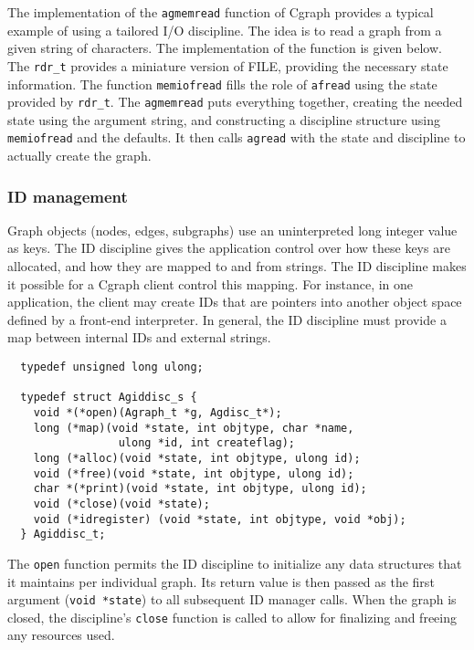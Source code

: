 \documentclass[11pt,letterpaper]{article}
\begin{document}
The implementation of the \verb"agmemread" function of Cgraph provides a typical example of using
a tailored I/O discipline. The idea is to read a graph from a given string of characters. The 
implementation of the function is given below.
The \verb"rdr_t" provides a miniature version of FILE, providing the necessary state information.
The function \verb"memiofread" fills the role of \verb"afread" using the state provided by \verb"rdr_t".
The \verb"agmemread" puts everything together, creating the needed state using the argument string, 
and constructing a discipline structure using \verb"memiofread" and the defaults. It then calls
\verb"agread" with the state and discipline to actually create the graph.


\subsubsection{ID management}
Graph objects (nodes, edges, subgraphs) use an uninterpreted long integer value as keys.
The ID discipline gives the application control over how these keys are allocated, and how
they are mapped to and from strings.
The ID discipline makes it possible for a Cgraph client
control this mapping.  For instance, in one application, the client
may create IDs that are pointers into another object space defined by
a front-end interpreter.  In general, the ID discipline must provide
a map between internal IDs and external strings.  

\begin{verbatim}
  typedef unsigned long ulong;

  typedef struct Agiddisc_s {
    void *(*open)(Agraph_t *g, Agdisc_t*);
    long (*map)(void *state, int objtype, char *name, 
                 ulong *id, int createflag);
    long (*alloc)(void *state, int objtype, ulong id);
    void (*free)(void *state, int objtype, ulong id);
    char *(*print)(void *state, int objtype, ulong id);
    void (*close)(void *state);
    void (*idregister) (void *state, int objtype, void *obj);
  } Agiddisc_t;
\end{verbatim}

The \verb"open" function permits the ID discipline to initialize any data structures that it maintains 
per individual graph. Its return value is then passed as the first argument (\verb"void *state") to all 
subsequent ID manager calls.
When the graph is closed, the discipline's \verb"close" function is called to allow for finalizing and
freeing any resources used.
\end{document}
